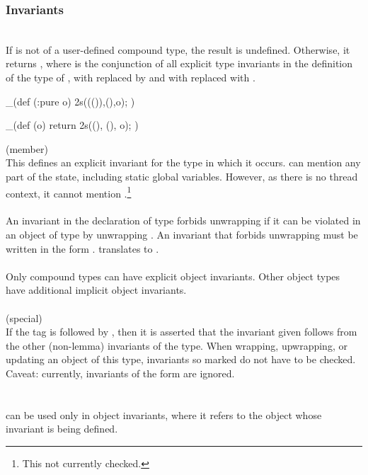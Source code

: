 \documentclass[preprint,nocopyrightspace]{sigplanconf}
\begin{document}
{{{\subsubsection{Invariants}

\\
If  is not of a user-defined compound type, the result is 
undefined. Otherwise, it returns , where 
is the conjunction of all explicit 
type invariants in the definition of the type of ,
with  replaced by  and
with \vcc{\this} replaced with .

\begin{VCC}
_(def \bool {}(:pure \object o)
{ \return \inv2s(\old(\now()),\now(),o); })
\end{VCC}

\begin{VCC}
_(def \bool \inv(\object o)
{ return \inv2s(\now(), \now(), o); })
\end{VCC}

\noindent{} (member)\\
This defines an explicit invariant for the type in which it occurs.
 can mention any part of the state, including
static global variables. However, as there is no thread context, it
cannot mention \vcc{\me}.\footnote{This not currently checked.}
\\\\
An invariant in the declaration of type  forbids unwrapping if
it can be violated in an object  of type  by
unwrapping . An invariant that forbids unwrapping must be
written in the form . 
 translates to 
.
\\\\
Only compound types can have explicit object invariants. Other object
types have additional implicit object invariants.
\\\\
 (special)\\
If the  tag is followed by , then it is
asserted that the invariant given follows from the other (non-lemma)
invariants of the type. When wrapping, upwrapping, or updating an
object of this type, invariants so marked do not have to be checked.
Caveat: currently,  invariants of the form
 are ignored.
\\\\
\\
\vcc{\this} can be used only in object invariants, where it refers to the
object whose invariant is being defined.

}}}
\end{document}
